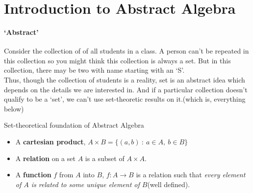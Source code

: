 



\section{Introduction to Abstract Algebra}
\begin{story}
\paragraph{`Abstract'}
Consider the collection of of all students in a class. A person can't be repeated in this collection so you might think this collection is always a set. But in this collection, there may be two with name starting with an `S'.\\

Thus, though the collection of students is a reality, set is an abstract idea which depends on the details we are interested in. And if a particular collection doesn't qualify to be a `set', we can't use set-theoretic results on it.(which is, everything below)
\end{story}

\begin{definition}Set-theoretical foundation of Abstract Algebra
	\begin{itemize}
		\item A \textbf{cartesian product}, $A \times B = \{ (a,b) \ : \ a \in A,\ b \in B \}$ %
		\item A \textbf{relation} on a set $A$ is a subset of $A \times A$. %
		\item A \textbf{function} $f$ from $A$ into $B$, $f : A \to B$ is a relation such that \textit{every element of $A$ is related to some unique element of $B$}(well defined). %
	\end{itemize}
\end{definition}

